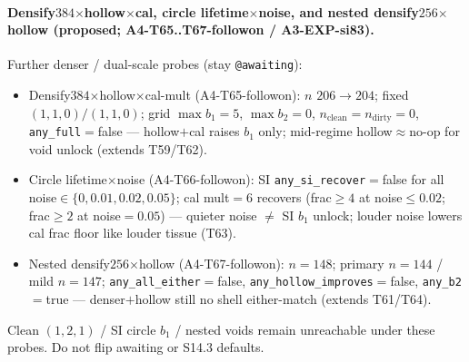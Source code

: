 \documentclass[11pt]{article}
\begin{document}
\paragraph{Densify$384$$\times$hollow$\times$cal, circle lifetime$\times$noise, and
nested densify$256$$\times$hollow (proposed; A4-T65..T67-followon / A3-EXP-si83).}
Further denser / dual-scale probes (stay \texttt{@awaiting}):
\begin{itemize}[leftmargin=1.5em]
  \item Densify$384$$\times$hollow$\times$cal-mult (A4-T65-followon):
  $n$ $206\to 204$; fixed $(1,1,0)/(1,1,0)$; grid $\max b_1{=}5$,
  $\max b_2{=}0$, $n_{\mathrm{clean}}{=}n_{\mathrm{dirty}}{=}0$,
  \texttt{any\_full}${=}$false --- hollow$+$cal raises $b_1$ only; mid-regime
  hollow$\approx$no-op for void unlock (extends T59/T62).
  \item Circle lifetime$\times$noise (A4-T66-followon): SI
  \texttt{any\_si\_recover}${=}$false for all noise$\in\{0,0.01,0.02,0.05\}$;
  cal mult${=}6$ recovers (frac$\ge 4$ at noise$\le 0.02$; frac$\ge 2$ at
  noise${=}0.05$) --- quieter noise $\neq$ SI $b_1$ unlock; louder noise
  lowers cal frac floor like louder tissue (T63).
  \item Nested densify$256$$\times$hollow (A4-T67-followon): $n{=}148$;
  primary $n{=}144$ / mild $n{=}147$;
  \texttt{any\_all\_either}${=}$false,
  \texttt{any\_hollow\_improves}${=}$false, \texttt{any\_b2}${=}$true ---
  denser$+$hollow still no shell either-match (extends T61/T64).
\end{itemize}
Clean $(1,2,1)$ / SI circle $b_1$ / nested voids remain unreachable under
these probes. Do not flip awaiting or S14.3 defaults.
\end{document}
